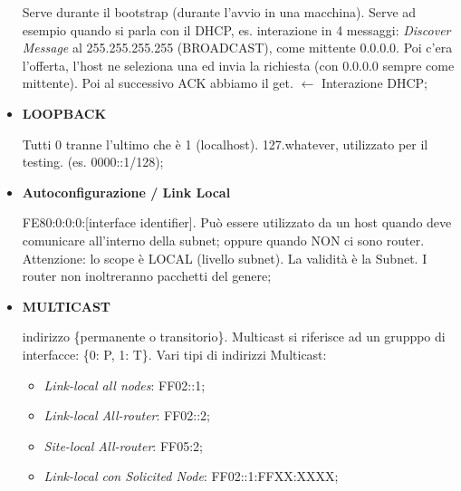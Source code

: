 \begin{itemize}
Serve durante il bootstrap (durante l'avvio in una macchina). Serve ad esempio quando si parla con il DHCP, es. interazione in 4 messaggi: \textit{Discover Message} al 255.255.255.255 (BROADCAST), come mittente 0.0.0.0. Poi c'era l'offerta, l'host ne seleziona una ed invia la richiesta (con 0.0.0.0 sempre come mittente). Poi al successivo ACK abbiamo il get. $\leftarrow$ Interazione DHCP;

\item{\textbf{LOOPBACK}}

Tutti 0 tranne l'ultimo che è 1 (localhost). 127.whatever, utilizzato per il testing. (es. 0000::1/128);

\item{\textbf{Autoconfigurazione / Link Local}}

FE80:0:0:0:[interface identifier]. Può essere utilizzato da un host quando deve comunicare all'interno della subnet; oppure quando NON ci sono router. Attenzione: lo scope è LOCAL (livello subnet). La validità è la Subnet. I router non inoltreranno pacchetti del genere;

\item{\textbf{MULTICAST}}

indirizzo \{permanente o transitorio\}. Multicast si riferisce ad un grupppo di interfacce: \{0: P, 1: T\}.
Vari tipi di indirizzi Multicast:

\begin{itemize}

\item{\textit{Link-local all nodes}}: FF02::1;
\item{\textit{Link-local All-router}}: FF02::2; 
\item{\textit{Site-local All-router}}: FF05:2;
\item{\textit{Link-local con Solicited Node}}: FF02::1:FFXX:XXXX;
\end{itemize}

\end{itemize}


